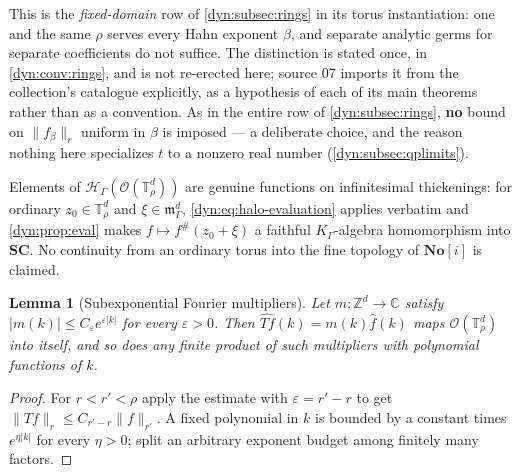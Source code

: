 \documentclass[11pt,letterpaper]{article}
\newtheorem{lemma}[lemma]{Lemma}
\theoremstyle{definition}
\theoremstyle{remark}
\newcommand{\C}{\mathbb C}
\newcommand{\Z}{\mathbb Z}
\newcommand{\No}{\mathbf{No}}
\newcommand{\SC}{\mathbf{SC}}
\newcommand{\HH}{\mathscr H}
\newcommand{\OO}{\mathcal O}
\newcommand{\m}{\mathfrak m}
\newcommand{\eps}{\varepsilon}
\newcommand{\TT}{\mathbb T}
\newcommand{\strip}{\OO(\TT^{d}_{\rho})}
\numberwithin{equation}{section}
\begin{document}
This is the \emph{fixed-domain} row of \cref{dyn:subsec:rings} in its torus
instantiation: one and the same $\rho$ serves every Hahn exponent $\beta$,
and separate analytic germs for separate coefficients do not suffice. The
distinction is stated once, in \cref{dyn:conv:rings}, and is not re-erected
here; source 07 imports it from the collection's catalogue explicitly, as
a hypothesis of each of its main theorems rather than as a convention. As
in the entire row of \cref{dyn:subsec:rings}, \textbf{no} bound on
$\|f_\beta\|_{r}$ uniform in $\beta$ is imposed --- a deliberate choice,
and the reason nothing here specializes $t$ to a nonzero real number
(\cref{dyn:subsec:qplimits}).

Elements of $\HH_\Gamma(\strip)$ are genuine functions on infinitesimal
thickenings: for ordinary $z_0\in\TT^{d}_\rho$ and $\xi\in\m_\Gamma^{d}$,
\eqref{dyn:eq:halo-evaluation} applies verbatim and
\cref{dyn:prop:eval} makes $f\mapsto f^{\#}(z_0+\xi)$ a faithful
$K_\Gamma$-algebra homomorphism into $\SC$. No continuity from an ordinary
torus into the fine topology of $\No[i]$ is claimed.

\begin{lemma}[Subexponential Fourier multipliers]\label{dyn:lem:qpmultiplier}
Let $m:\Z^{d}\to\C$ satisfy $|m(k)|\le C_\eps e^{\eps|k|}$ for every
$\eps>0$. Then $\widehat{Tf}(k)=m(k)\widehat f(k)$ maps $\strip$ into
itself, and so does any finite product of such multipliers with polynomial
functions of $k$.
\end{lemma}
\begin{proof}
For $r<r'<\rho$ apply the estimate with $\eps=r'-r$ to get
$\|Tf\|_{r}\le C_{r'-r}\|f\|_{r'}$. A fixed polynomial in $k$ is bounded by
a constant times $e^{\eta|k|}$ for every $\eta>0$; split an arbitrary
exponent budget among finitely many factors.
\end{proof}
\end{document}
